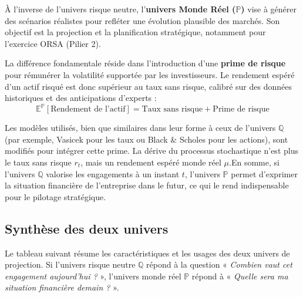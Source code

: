 À l'inverse de l'univers risque neutre, l'\textbf{univers Monde Réel ($\mathbb{P}$)} vise à générer des scénarios réalistes pour refléter une évolution plausible des marchés. Son objectif est la projection et la planification stratégique, notamment pour l'exercice ORSA (Pilier 2). 

La différence fondamentale réside dans l'introduction d'une \textbf{prime de risque} pour rémunérer la volatilité supportée par les investisseurs. Le rendement espéré d'un actif risqué est donc supérieur au taux sans risque, calibré sur des données historiques et des anticipations d'experts :
\begin{equation}
    \mathbb{E}^{\mathbb{P}}[\text{Rendement de l'actif}] = \text{Taux sans risque} + \text{Prime de risque}
\end{equation}

Les modèles utilisés, bien que similaires dans leur forme à ceux de l'univers $\mathbb{Q}$ (par exemple, Vasicek pour les taux ou Black \& Scholes pour les actions), sont modifiés pour intégrer cette prime. La dérive du processus stochastique n'est plus le taux sans risque $r_t$, mais un rendement espéré monde réel $\mu$.En somme, si l'univers $\mathbb{Q}$ valorise les engagements à un instant $t$, l'univers $\mathbb{P}$ permet d'exprimer la situation financière de l'entreprise dans le futur, ce qui le rend indispensable pour le pilotage stratégique.

\subsection{Synthèse des deux univers}

Le tableau suivant résume les caractéristiques et les usages des deux univers de projection. Si l'univers risque neutre $\mathbb{Q}$ répond à la question « \textit{Combien vaut cet engagement aujourd'hui ?} », l'univers monde réel $\mathbb{P}$ répond à « \textit{Quelle sera ma situation financière demain ?} ».

